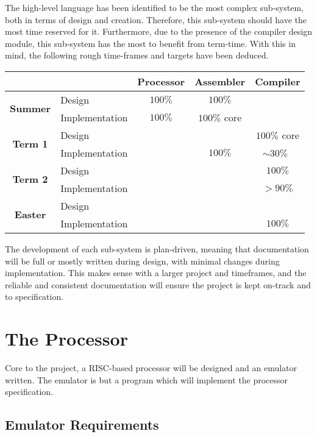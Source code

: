 \documentclass{article}
\begin{document}
The high-level language has been identified to be the most complex sub-system, both in terms of design and creation.
Therefore, this sub-system should have the most time reserved for it.
Furthermore, due to the presence of the compiler design module, this sub-system has the most to benefit from term-time.
With this in mind, the following rough time-frames and targets have been deduced.

\medskip
\begin{longtable}{|c|l|c|c|c|}
    \hline
    \multicolumn{2}{|c|}{} & \textbf{Processor} & \textbf{Assembler} & \textbf{Compiler} \\
    \hline
    \multirow{2}{*}{\textbf{Summer}} & Design & \(100\%\) & \(100\%\) & \\
    \cline{2-5}
    & Implementation & \(100\%\) & \(100\%\) core & \\
    \hline
    \multirow{2}{*}{\textbf{Term 1}} & Design & & & \(100\%\) core \\
    \cline{2-5}
    & Implementation & & \(100\%\) & \(\sim 30\%\)\ \\
    \hline
    \multirow{2}{*}{\textbf{Term 2}} & Design & & & \(100\%\) \\
    \cline{2-5}
    & Implementation & & & \(> 90\%\) \\
    \hline
    \multirow{2}{*}{\textbf{Easter}} & Design & & & \\
    \cline{2-5}
    & Implementation & & & \(100\%\) \\
    \hline
\end{longtable}
\medskip

The development of each sub-system is plan-driven, meaning that documentation will be full or mostly written during design, with minimal changes during implementation.
This makes sense with a larger project and timeframes, and the reliable and consistent documentation will ensure the project is kept on-track and to specification.

\section{The Processor}

Core to the project, a RISC-based processor will be designed and an emulator written.
The emulator is but a program which will implement the processor specification.

\subsection{Emulator Requirements}
\end{document}
